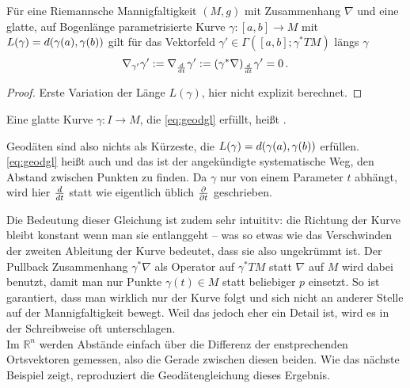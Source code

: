 \documentclass[../H_Analysis_main.tex]{subfiles}
\begin{document}
\begin{satz}
Für eine Riemannsche Mannigfaltigkeit $(M, g)$ mit Zusammenhang $\nabla$ und eine glatte, auf Bogenlänge parametrisierte Kurve $\gamma: [a, b] \rightarrow M$ mit $L(\gamma) = d\qty(\gamma(a), \gamma(b))$ gilt für das Vektorfeld $\gamma' \in \Gamma([a, b]; \gamma^* TM)$ längs $\gamma$
\begin{equation}\label{eq:geodgl}
\nabla_{\gamma'} \gamma' := \nabla_{\dv{t}} \gamma' := \qty(\gamma^* \nabla)_{\dv{t}} \gamma' = 0 \, .
\end{equation}
\end{satz}

\begin{proof}
Erste Variation der Länge $L(\gamma)$, hier nicht explizit berechnet.
\end{proof}

\begin{defi}[Geodäte]
Eine glatte Kurve $\gamma: I \rightarrow M$, die \eqref{eq:geodgl} erfüllt, heißt .
\end{defi}

Geodäten sind also nichts als Kürzeste, die $L(\gamma) = d\qty(\gamma(a), \gamma(b))$ erfüllen. \eqref{eq:geodgl} heißt auch  und das ist der angekündigte systematische Weg, den Abstand zwischen Punkten zu finden. Da $\gamma$ nur von einem Parameter $t$ abhängt, wird hier $\dv{t}$ statt wie eigentlich üblich $\pdv{t}$ geschrieben.

Die Bedeutung dieser Gleichung ist zudem sehr intuititv: die Richtung der Kurve bleibt konstant wenn man sie entlanggeht -- was so etwas wie das Verschwinden der zweiten Ableitung der Kurve bedeutet, dass sie also ungekrümmt ist. Der Pullback Zusammenhang $\gamma^*\nabla$ als Operator auf $\gamma^* TM$ statt $\nabla$ auf $M$ wird dabei benutzt, damit man nur Punkte $\gamma(t) \in M$ statt beliebiger $p$ einsetzt. So ist garantiert, dass man wirklich nur der Kurve folgt und sich nicht an anderer Stelle auf der Mannigfaltigkeit bewegt. Weil das jedoch eher ein Detail ist, wird es in der Schreibweise oft unterschlagen.\\


Im $\mathbb{R}^n$ werden Abstände einfach über die Differenz der enstprechenden Ortsvektoren gemessen, also die Gerade zwischen diesen beiden. Wie das nächste Beispiel zeigt, reproduziert die Geodätengleichung dieses Ergebnis.
\end{document}
